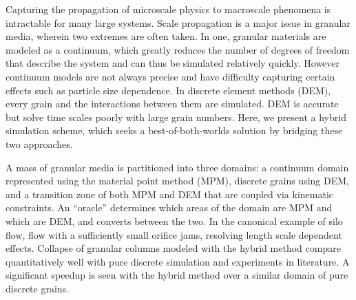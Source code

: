% 
% 
%
Capturing the propagation of microscale physics to macroscale phenomena is intractable for many large systems. Scale propagation is a major issue in granular media, wherein two extremes are often taken. In one, granular materials are modeled as a continuum, which greatly reduces the number of degrees of freedom that describe the system and can thus be simulated relatively quickly. However continuum models are not always precise and have difficulty capturing certain effects such as particle size dependence. In discrete element methods (DEM), every grain and the interactions between them are simulated. DEM is accurate but solve time scales poorly with large grain numbers. Here, we present a hybrid simulation scheme, which seeks a best-of-both-worlds solution by bridging these two approaches.

A mass of granular media is partitioned into three domains: a continuum domain represented using the material point method (MPM), discrete grains using DEM, and a transition zone of both MPM and DEM that are coupled via kinematic constraints. An “oracle” determines which areas of the domain are MPM and which are DEM, and converts between the two. In the canonical example of silo flow, flow with a sufficiently small orifice jams, resolving length scale dependent effects. Collapse of granular columns modeled with the hybrid method compare quantitatively well with pure discrete simulation and experiments in literature. A significant speedup is seen with the hybrid method over a similar domain of pure discrete grains.
